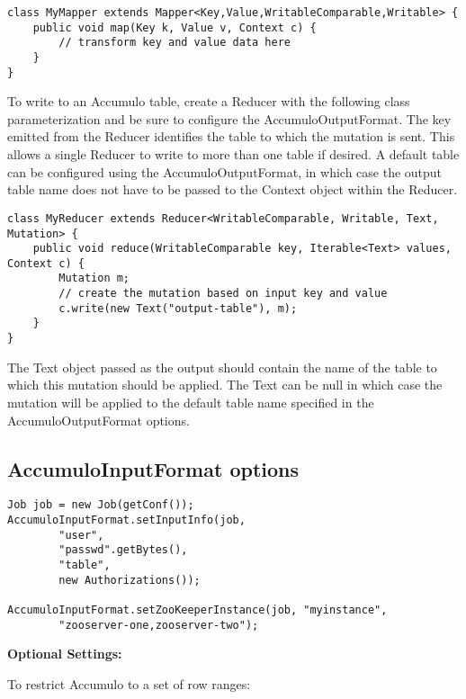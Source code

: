 \begingroup\fontsize{8pt}{8pt}\selectfont\begin{verbatim}
class MyMapper extends Mapper<Key,Value,WritableComparable,Writable> {
    public void map(Key k, Value v, Context c) {
        // transform key and value data here
    }
}
\end{verbatim}\endgroup

To write to an Accumulo table, create a Reducer with the following class
parameterization and be sure to configure the AccumuloOutputFormat. The key
emitted from the Reducer identifies the table to which the mutation is sent. This
allows a single Reducer to write to more than one table if desired. A default table
can be configured using the AccumuloOutputFormat, in which case the output table
name does not have to be passed to the Context object within the Reducer.

\begingroup\fontsize{8pt}{8pt}\selectfont\begin{verbatim}
class MyReducer extends Reducer<WritableComparable, Writable, Text, Mutation> {
    public void reduce(WritableComparable key, Iterable<Text> values, Context c) {
        Mutation m;
        // create the mutation based on input key and value
        c.write(new Text("output-table"), m);
    }
}
\end{verbatim}\endgroup

The Text object passed as the output should contain the name of the table to which
this mutation should be applied. The Text can be null in which case the mutation
will be applied to the default table name specified in the AccumuloOutputFormat
options.

\subsection{AccumuloInputFormat options}

\begingroup\fontsize{8pt}{8pt}\selectfont\begin{verbatim}
Job job = new Job(getConf());
AccumuloInputFormat.setInputInfo(job,
        "user",
        "passwd".getBytes(),
        "table",
        new Authorizations());

AccumuloInputFormat.setZooKeeperInstance(job, "myinstance",
        "zooserver-one,zooserver-two");
\end{verbatim}\endgroup

\Large
\textbf{Optional Settings:}
\normalsize

To restrict Accumulo to a set of row ranges:


